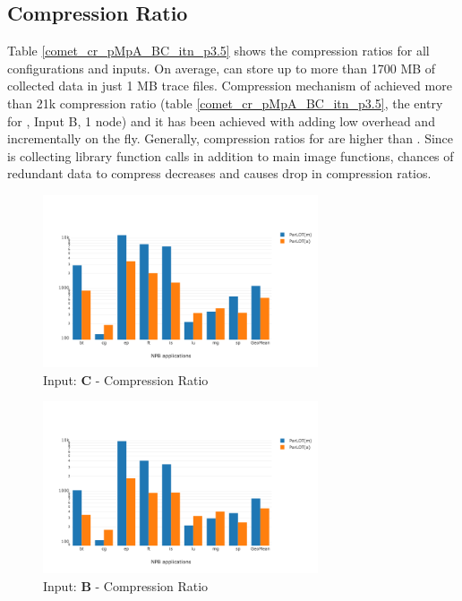   
\subsection{Compression Ratio}
\label{subsec:cr}

Table \ref{comet_cr_pMpA_BC_itn_p3.5} shows the compression ratios for all configurations and inputs. On average, \parlot can store up to more than 1700 MB of collected data in just 1 MB trace files. Compression mechanism of \parlot achieved more than 21k compression ratio (table \ref{comet_cr_pMpA_BC_itn_p3.5}, the entry for \parlotm, Input B, 1 node) and it has been achieved with adding low overhead and incrementally on the fly.
Generally, compression ratios for \parlotm are higher than \parlota. Since \parlota is collecting library function calls in addition to main image functions, chances of redundant data to compress decreases and causes drop in compression ratios.
  



\begin{figure}[!t]
\centering
\includegraphics[width=3.2in]{figs.comet.newMed/comet_chartAvg_cr_C_p3_5.png}
\caption{ Input: \textbf{C}  - Compression Ratio
}
\label{comet_chartAvg_cr_C_p3_5}
\end{figure}


\begin{figure}[!t]
\centering
\includegraphics[width=3.2in]{figs.comet.newMed/comet_chartAvg_cr_B_p3_5.png}
\caption{ Input: \textbf{B}  - Compression Ratio
}
\label{comet_chartAvg_cr_B_p3_5}
\end{figure}
  
